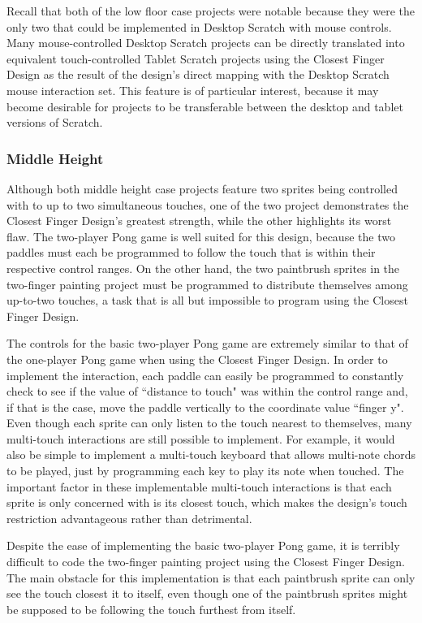 Recall that both of the low floor case projects were notable because they were the only two that could be implemented in Desktop Scratch with mouse controls. Many mouse-controlled Desktop Scratch projects can be directly translated into equivalent touch-controlled Tablet Scratch projects using the Closest Finger Design as the result of the design's direct mapping with the Desktop Scratch mouse interaction set. This feature is of particular interest, because it may become desirable for projects to be transferable between the desktop and tablet versions of Scratch.

\subsubsection{Middle Height}

Although both middle height case projects feature two sprites being controlled with to up to two simultaneous touches, one of the two project demonstrates the Closest Finger Design's greatest strength, while the other highlights its worst flaw. The two-player Pong game is well suited for this design, because the two paddles must each be programmed to follow the touch that is within their respective control ranges. On the other hand, the two paintbrush sprites in the two-finger painting project must be programmed to distribute themselves among up-to-two touches, a task that is all but impossible to program using the Closest Finger Design.

The controls for the basic two-player Pong game are extremely similar to that of the one-player Pong game when using the Closest Finger Design. In order to implement the interaction, each paddle can easily be programmed to constantly check to see if the value of ``distance to touch" was within the control range and, if that is the case, move the paddle vertically to the coordinate value ``finger y". Even though each sprite can only listen to the touch nearest to themselves, many multi-touch interactions are still possible to implement. For example, it would also be simple to implement a multi-touch keyboard that allows multi-note chords to be played, just by programming each key to play its note when touched. The important factor in these implementable multi-touch interactions is that each sprite is only concerned with is its closest touch, which makes the design's touch restriction advantageous rather than detrimental.

Despite the ease of implementing the basic two-player Pong game, it is terribly difficult to code the two-finger painting project using the Closest Finger Design. The main obstacle for this implementation is that each paintbrush sprite can only see the touch closest it to itself, even though one of the paintbrush sprites might be supposed to be following the touch furthest from itself. 

